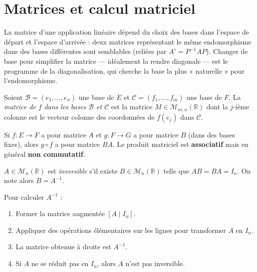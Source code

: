 \documentclass[11pt,a4paper,twoside]{book}
\newcommand{\R}{\mathbb{R}}
\begin{document}
\section{Matrices et calcul matriciel}

La matrice d'une application linéaire dépend du choix des bases dans l'espace de départ et l'espace d'arrivée : deux matrices représentant le même endomorphisme dans des bases différentes sont semblables (reliées par $A' = P^{-1}AP$). Changer de base pour simplifier la matrice — idéalement la rendre diagonale — est le programme de la diagonalisation, qui cherche la base la plus « naturelle » pour l'endomorphisme.

\begin{definitionbox}
Soient $\mathcal{B} = (e_1,\ldots,e_n)$ une base de $E$ et $\mathcal{C} = (f_1,\ldots,f_m)$ une base de $F$.
La \emph{matrice de $f$ dans les bases $\mathcal{B}$ et $\mathcal{C}$} est la matrice
$M \in \mathcal{M}_{m,n}(\R)$ dont la $j$-ième colonne est le vecteur colonne
des coordonnées de $f(e_j)$ dans $\mathcal{C}$.
\end{definitionbox}

\begin{theoremebox}
Si $f : E \to F$ a pour matrice $A$ et $g : F \to G$ a pour matrice $B$ (dans des bases fixes),
alors $g \circ f$ a pour matrice $BA$.
Le produit matriciel est \textbf{associatif} mais en général \textbf{non commutatif}.
\end{theoremebox}

\begin{definitionbox}
$A \in \mathcal{M}_n(\R)$ est \emph{inversible} s'il existe $B \in \mathcal{M}_n(\R)$ telle que $AB = BA = I_n$.
On note alors $B = A^{-1}$.
\end{definitionbox}

\begin{methodebox}
Pour calculer $A^{-1}$ :
\begin{enumerate}
  \item Former la matrice augmentée $[A \mid I_n]$.
  \item Appliquer des opérations élémentaires sur les lignes pour transformer $A$ en $I_n$.
  \item La matrice obtenue à droite est $A^{-1}$.
  \item Si $A$ ne se réduit pas en $I_n$, alors $A$ n'est pas inversible.
\end{enumerate}
\end{methodebox}
\end{document}
